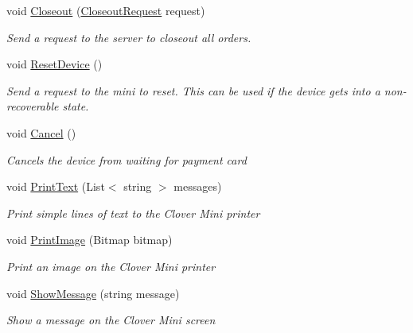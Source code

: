 \begin{DoxyCompactItemize}
void \hyperlink{classcom_1_1clover_1_1remotepay_1_1sdk_1_1_clover_connector_aa8348f5f0769ad3023858d310e5aa847}{Closeout} (\hyperlink{classcom_1_1clover_1_1remotepay_1_1sdk_1_1_closeout_request}{Closeout\+Request} request)
\begin{DoxyCompactList}\small\item\em Send a request to the server to closeout all orders. \end{DoxyCompactList}\item 
void \hyperlink{classcom_1_1clover_1_1remotepay_1_1sdk_1_1_clover_connector_a422575429ff010ed302c57eb5542c35f}{Reset\+Device} ()
\begin{DoxyCompactList}\small\item\em Send a request to the mini to reset. This can be used if the device gets into a non-\/recoverable state. \end{DoxyCompactList}\item 
void \hyperlink{classcom_1_1clover_1_1remotepay_1_1sdk_1_1_clover_connector_a6ca6015f34bf85df7d4242add5751606}{Cancel} ()
\begin{DoxyCompactList}\small\item\em Cancels the device from waiting for payment card \end{DoxyCompactList}\item 
void \hyperlink{classcom_1_1clover_1_1remotepay_1_1sdk_1_1_clover_connector_a1601ef2709d1e2eb53fa92ff1ee46823}{Print\+Text} (List$<$ string $>$ messages)
\begin{DoxyCompactList}\small\item\em Print simple lines of text to the Clover Mini printer \end{DoxyCompactList}\item 
void \hyperlink{classcom_1_1clover_1_1remotepay_1_1sdk_1_1_clover_connector_a4743d4155d22ddc978602814cb72ee6b}{Print\+Image} (Bitmap bitmap)
\begin{DoxyCompactList}\small\item\em Print an image on the Clover Mini printer \end{DoxyCompactList}\item 
void \hyperlink{classcom_1_1clover_1_1remotepay_1_1sdk_1_1_clover_connector_a6efd4dc87eaf16f949b9aeb93e7af464}{Show\+Message} (string message)
\begin{DoxyCompactList}\small\item\em Show a message on the Clover Mini screen \end{DoxyCompactList}\item 

\end{DoxyCompactItemize}
